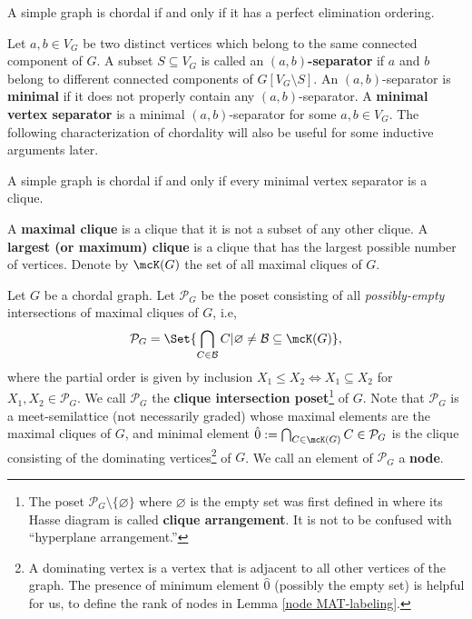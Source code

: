\begin{theorem}
  \label{thm:chordal-PEO}
A simple graph is chordal if and only if it has a perfect elimination ordering. 
\end{theorem}


Let $ a,b \in V_{G} $ be two distinct vertices which belong to the same connected component of $ G $. 
A subset $ S \subseteq V_{G} $ is called an \textbf{$ (a,b) $-separator} if $ a $ and $ b $ belong to different connected components of $ G[V_{G}\setminus S] $. 
An $ (a,b) $-separator is \textbf{minimal} if it does not properly contain any $ (a,b) $-separator. 
A \textbf{minimal vertex separator} is a minimal $ (a,b) $-separator for some $ a,b \in V_{G} $. 
The following characterization of chordality will also be useful for some inductive arguments later. 
\begin{theorem}\label{Dirac minimal vertex separator}
A simple graph is chordal if and only if every minimal vertex separator is a clique. 
\end{theorem}

A \textbf{maximal clique} is a clique that it is not a subset of any other clique. 
A \textbf{largest (or maximum) clique} is a clique that has the largest possible number of vertices. 
Denote by $\mcK(G)$ the set of all maximal cliques of $G$.

Let $G$ be a chordal graph. 
Let $ \mathcal{P}_{G} $ be the poset consisting of  all \emph{possibly-empty} intersections of maximal cliques of $ G $, i.e, 
$$
 \mathcal{P}_{G} = \Set{\bigcap_{C \in \mathcal{B}}C  |   \varnothing \ne \mathcal{B} \subseteq \mcK(G) },
$$
where the partial order is given by inclusion $X_1\le X_2\Leftrightarrow X_1\subseteq X_2$ for $X_1, X_2 \in \mathcal{P}_{G}$. 
We call $ \mathcal{P}_{G} $ the \textbf{clique intersection poset}\footnote{The poset $ \mathcal{P}_{G}  \setminus \{\varnothing\}$ where  $\varnothing$ is the empty set was first defined in \cite{nevries2015characterizing-dam} where its Hasse diagram is called \textbf{clique arrangement}. It is not to be confused with ``hyperplane arrangement.''}
 of $ G $. 
Note that $ \mathcal{P}_{G} $  is a meet-semilattice (not necessarily graded) whose maximal elements are the maximal cliques of $G$, and minimal element $ \hat{0}:=\bigcap_{C \in \mcK(G) }C \in  \mathcal{P}_{G} $ is the clique consisting of the dominating vertices\footnote{A dominating vertex is a  vertex that is adjacent to all other vertices of the graph. The presence of minimum  element $ \hat{0}$  (possibly the empty set) is helpful for us, \eg  to define the rank of nodes in Lemma \ref{node MAT-labeling}.}
of $ G $.
We call an element of $ \mathcal{P}_{G} $ a \textbf{node}. 



